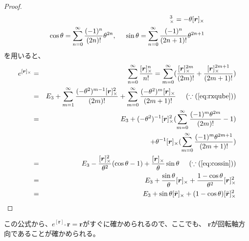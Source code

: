 \documentclass[10pt]{jarticle}
\newcommand{\exprx}{e^{[\boldsymbol{r}]_{\times}}}
\newcommand{\rx}{[\boldsymbol{r}]_{\times}}
\newcommand{\brx}{[\bar{\boldsymbol{r}}]_{\times}}
\begin{document}
\begin{proof}
    \begin{eqnarray}
        \rx^3 = -\theta \rx \label{eq:rxqube} \\
        \cos \theta = \sum_{n=0}^\infty \frac{(-1)^n}{(2n)!}\theta^{2n}, \hspace{5mm}
        \sin \theta = \sum_{n=0}^\infty \frac{(-1)^n}{(2n+1)!}\theta^{2n+1} \label{eq:cossin}
     \end{eqnarray}
     を用いると、
    \begin{eqnarray}
        \exprx 
        &=& \sum_{n=0}^\infty \frac{\rx^n}{n!}
        = \sum_{m=0}^{\infty} (\frac{\rx^{2m}}{(2m)!} + \frac{\rx^{2m+1}}{(2m+1)!}) \nonumber\\
        &=& E_3 + \sum_{m=1}^\infty \frac{(-\theta^2)^{m-1} \rx^2}{(2m)!} 
        + \sum_{m=0}^\infty \frac{(-\theta^2)^m \rx}{(2m+1)!} \hspace{5mm} (\because (\ref{eq:rxqube})) \nonumber\\
        &=& E_3 + (-\theta^2)^{-1} \rx^2 (\sum_{m=0}^\infty \frac{(-1)^m\theta^{2m}}{(2m)!} - 1) \nonumber\\
        && + \theta^{-1} \rx (\sum_{m=0}^\infty \frac{(-1)^m\theta^{2m+1}}{(2m+1)!} ) \nonumber\\
        &=& E_3 - \frac{\rx^2}{\theta^2}(\cos\theta - 1) + \frac{\rx}{\theta} \sin\theta 
        \hspace{5mm}(\because(\ref{eq:cossin})) \nonumber\\
        &=& E_3 + \frac{\sin \theta}{\theta}\rx
        + \frac{1-\cos \theta}{\theta^2}\rx^2 \nonumber\\
        &=& E_3 + \sin\theta \brx + (1-\cos \theta)\brx^2 \nonumber
    \end{eqnarray}
\end{proof}

この公式から、$e^{[\boldsymbol{r}]_{\times }} \boldsymbol{r} = \boldsymbol{r}$がすぐに確かめられるので、ここでも、
$\boldsymbol{r}$が回転軸方向であることが確かめられる。
\end{document}
